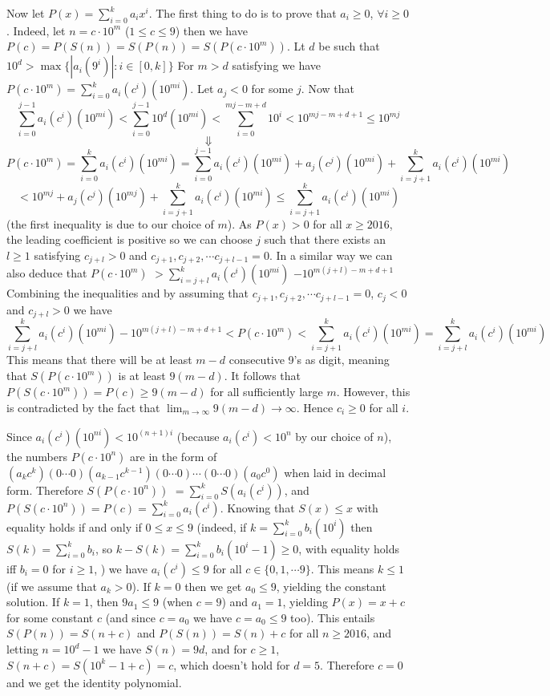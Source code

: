 \documentclass[11pt,a4paper]{article}
\begin{document}
\begin{itemize}
Now let $P(x)=\displaystyle\sum_{i=0}^k a_ix^i$. 
The first thing to do is to prove that $a_i\ge 0$, $\forall i\ge 0$. 
Indeed, let $n=c\cdot 10^m$ ($1\le c\le 9$) then we have 
$P(c)=P(S(n))=S(P(n))=S(P(c\cdot 10^m))$. 
Lt $d$ be such that 
$10^{d}>\max\{|a_i(9^i)| : i\in [0, k]\}$
For $m>d$ satisfying we have 
$P(c\cdot 10^m)=\displaystyle\sum_{i=0}^k a_i (c^i)(10^{mi})$. 
Let $a_j<0$ for some $j$. 
Now that 
\[\displaystyle\sum_{i=0}^{j-1} a_i (c^i)(10^{mi})
<\displaystyle\sum_{i=0}^{j-1} 10^{d}(10^{mi})
<\displaystyle\sum_{i=0}^{mj-m+d} 10^i
<10^{mj-m+d+1}
\le 10^{mj}\]
\[\Downarrow\]
\[P(c\cdot 10^m)=\displaystyle\sum_{i=0}^k a_i (c^i)(10^{mi})
=\displaystyle\sum_{i=0}^{j-1} a_i (c^i)(10^{mi})
+a_j(c^j)(10^{mi})
+\displaystyle\sum_{i=j+1}^{k} a_i (c^i)(10^{mi})\]
\[<10^{mj}
+a_j(c^j)(10^{mj})
+\displaystyle\sum_{i=j+1}^{k} a_i (c^i)(10^{mi})
\le\displaystyle\sum_{i=j+1}^{k} a_i (c^i)(10^{mi})\]
(the first inequality is due to our choice of $m$). 
As $P(x)>0$ for all $x\ge 2016$, the leading coefficient is positive so we can choose $j$ such that there exists an $l\ge 1$ satisfying 
$c_{j+l}>0$ and $c_{j+1}, c_{j+2}, \cdots c_{j+l-1}=0$. 
In a similar way we can also deduce that 
$P(c\cdot 10^m)$
$>\displaystyle\sum_{i=j+l}^{k} a_i (c^i)(10^{mi})$
$-10^{m(j+l)-m+d+1}$
Combining the inequalities and by assuming that $c_{j+1}, c_{j+2}, \cdots c_{j+l-1}=0$, $c_j<0$ and $c_{j+l}>0$ we have 
\[
\displaystyle\sum_{i=j+l}^{k} a_i (c^i)(10^{mi})
-10^{m(j+l)-m+d+1}
<P(c\cdot 10^m)
<\displaystyle\sum_{i=j+1}^{k} a_i (c^i)(10^{mi})
=\displaystyle\sum_{i=j+l}^{k} a_i (c^i)(10^{mi})\]
This means that there will be at least $m-d$ consecutive 9's as digit, meaning that $S(P(c\cdot 10^m))$ is at least $9(m-d)$. 
It follows that $P(S(c\cdot 10^m))=P(c)\ge 9(m-d)$ for all sufficiently large $m$. 
However, this is contradicted by the fact that $\lim_{m\to\infty}9(m-d)\to\infty$. 
Hence $c_i\ge 0$ for all $i$. 

Since $a_i (c^i)(10^{ni}) < 10^{(n+1)i}$ (because $a_i(c^i)<10^n$ by our choice of $n$), 
the numbers $P(c\cdot 10^n)$ are in the form of $(a_kc^k)(0\cdots 0) (a_{k-1}c^{k-1})(0\cdots 0)\cdots(0\cdots 0)(a_0c^0)$ when laid in decimal form. 
Therefore 
$S(P(c\cdot 10^n))$
$=\displaystyle\sum_{i=0}^k S(a_i (c^i))$, 
and 
$P(S(c\cdot 10^n))=P(c)=\displaystyle\sum_{i=0}^k a_i (c^i)$. 
Knowing that $S(x)\le x$ with equality holds if and only if $0\le x\le 9$ 
(indeed, if $k=\displaystyle\sum_{i=0}^k b_i(10^i)$ then $S(k)=\displaystyle\sum_{i=0}^k b_i$, 
so $k-S(k)=\displaystyle\sum_{i=0}^k b_i(10^i -1)\ge 0$, 
with equality holds iff $b_i=0$ for $i\ge 1$, )
we have $a_i(c^i)\le 9$ for all $c\in \{0,1,\cdots 9\}$. 
This means $k\le 1$ (if we assume that $a_k > 0$). 
If $k=0$ then we get $a_0\le 9$, yielding the constant solution. 
If $k=1$, then $9a_1\le 9$ (when $c=9$) and $a_1=1$, yielding $P(x)=x+c$ for some constant $c$ 
(and since $c=a_0$ we have $c=a_0\le 9$ too). 
This entails $S(P(n))=S(n+c)$ and $P(S(n))=S(n)+c$ for all $n\ge 2016$, 
and letting $n=10^d-1$ we have $S(n)=9d$, and for $c\ge 1$, $S(n+c)=S(10^k-1+c)=c$, which doesn't hold for $d=5$. 
Therefore $c=0$ and we get the identity polynomial. 



\end{itemize}
\end{document}
